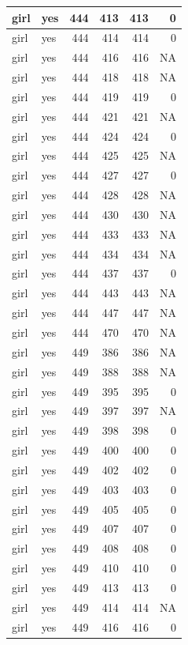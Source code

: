 \documentclass[man]{apa6}
\begin{document}
\begin{tabular}{l|l|r|r|r|r}
\hline
girl & yes & 444 & 413 & 413 & 0\\
\hline
girl & yes & 444 & 414 & 414 & 0\\
\hline
girl & yes & 444 & 416 & 416 & NA\\
\hline
girl & yes & 444 & 418 & 418 & NA\\
\hline
girl & yes & 444 & 419 & 419 & 0\\
\hline
girl & yes & 444 & 421 & 421 & NA\\
\hline
girl & yes & 444 & 424 & 424 & 0\\
\hline
girl & yes & 444 & 425 & 425 & NA\\
\hline
girl & yes & 444 & 427 & 427 & 0\\
\hline
girl & yes & 444 & 428 & 428 & NA\\
\hline
girl & yes & 444 & 430 & 430 & NA\\
\hline
girl & yes & 444 & 433 & 433 & NA\\
\hline
girl & yes & 444 & 434 & 434 & NA\\
\hline
girl & yes & 444 & 437 & 437 & 0\\
\hline
girl & yes & 444 & 443 & 443 & NA\\
\hline
girl & yes & 444 & 447 & 447 & NA\\
\hline
girl & yes & 444 & 470 & 470 & NA\\
\hline
girl & yes & 449 & 386 & 386 & NA\\
\hline
girl & yes & 449 & 388 & 388 & NA\\
\hline
girl & yes & 449 & 395 & 395 & 0\\
\hline
girl & yes & 449 & 397 & 397 & NA\\
\hline
girl & yes & 449 & 398 & 398 & 0\\
\hline
girl & yes & 449 & 400 & 400 & 0\\
\hline
girl & yes & 449 & 402 & 402 & 0\\
\hline
girl & yes & 449 & 403 & 403 & 0\\
\hline
girl & yes & 449 & 405 & 405 & 0\\
\hline
girl & yes & 449 & 407 & 407 & 0\\
\hline
girl & yes & 449 & 408 & 408 & 0\\
\hline
girl & yes & 449 & 410 & 410 & 0\\
\hline
girl & yes & 449 & 413 & 413 & 0\\
\hline
girl & yes & 449 & 414 & 414 & NA\\
\hline
girl & yes & 449 & 416 & 416 & 0\\

\end{tabular}
\end{document}
